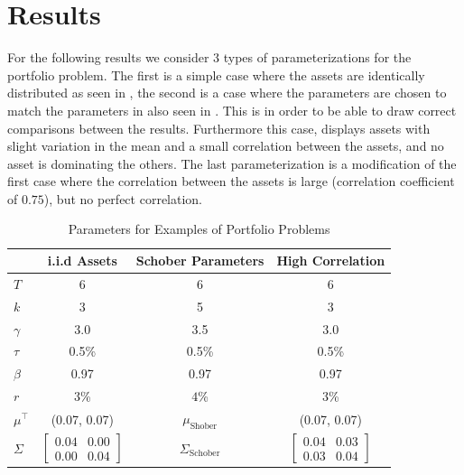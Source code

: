 \documentclass[11pt]{article}
\begin{document}
\fi

\section{Results} \label{Section: Results}
For the following results we consider 3 types of parameterizations for the portfolio problem.
The first is a simple case where the assets are identically distributed as seen in \autocite{CaiJuddXu2013},
the second is a case where the parameters are chosen to match the parameters in \autocite{Schober2022} also seen in \autocite{Scheidegger2023}.
This is in order to be able to draw correct comparisons between the results. Furthermore this case,
displays assets with slight variation in the mean and a small correlation between the assets, and no asset is dominating the others.
The last parameterization is a modification of the first case where the correlation between the assets is large (correlation coefficient of $0.75$), but no perfect correlation. 
\begin{table}[!ht]
    \label{table: Parameters_Base_Models}
    \centering
    \caption{Parameters for Examples of Portfolio Problems}
    \begin{tabular}{lccc}
    \toprule
    & \textbf{i.i.d Assets} & \textbf{Schober Parameters} & \textbf{High Correlation} \\
    \midrule
    $T$        & 6                & 6                & 6                \\
    $k$        & 3                & 5                & 3                \\
    $\gamma$   & 3.0              & 3.5              & 3.0              \\
    $\tau$     & 0.5\%            & 0.5\%            & 0.5\%            \\
    $\beta$    & 0.97             & 0.97             & 0.97             \\
    $r$        & $3$\% & $4$\%    &  $3$\% \\
    $\mu^\top$ & (0.07, 0.07) & $\mu_{\text{Shober}}$ & (0.07, 0.07) \\
    $\Sigma$   & 
    $\begin{bmatrix}
    0.04 & 0.00 \\
    0.00 & 0.04
    \end{bmatrix}$
    & $\Sigma_{\text{Schober}}$ 
    & 
    $\begin{bmatrix}
    0.04 & 0.03\\
    0.03 & 0.04
    \end{bmatrix}$ \\
    \bottomrule
    \end{tabular}
\end{table}
\end{document}
